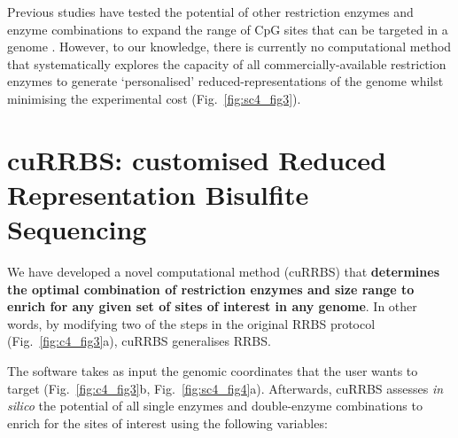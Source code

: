 \bigskip

Previous studies have tested the potential of other restriction enzymes and enzyme combinations to expand the range of CpG sites that can be targeted in a genome \cite{Cedar1979,Bystrykh2013,Martinez-Arguelles2014,Yu2004,Tanas2017,Lee2014,Wang2013,Kirschner2016}. However, to our knowledge, there is currently no computational method that systematically explores the capacity of all commercially-available restriction enzymes to generate `personalised' reduced-representations of the genome whilst minimising the experimental cost (Fig.~\ref{fig:sc4_fig3}).

\smallskip

\section{cuRRBS: customised Reduced Representation Bisulfite Sequencing}

\smallskip

We have developed a novel computational method (cuRRBS) that \textbf{determines the optimal combination of restriction enzymes and size range to enrich for any given set of sites of interest in any genome}. In other words, by modifying two of the steps in the original RRBS protocol (Fig.~\ref{fig:c4_fig3}a), cuRRBS generalises RRBS.

\bigskip

The software takes as input the genomic coordinates that the user wants to target (Fig.~\ref{fig:c4_fig3}b, Fig.~\ref{fig:sc4_fig4}a). Afterwards, cuRRBS assesses \textit{in silico} the potential of all single enzymes and double-enzyme combinations to enrich for the sites of interest using the following variables:

